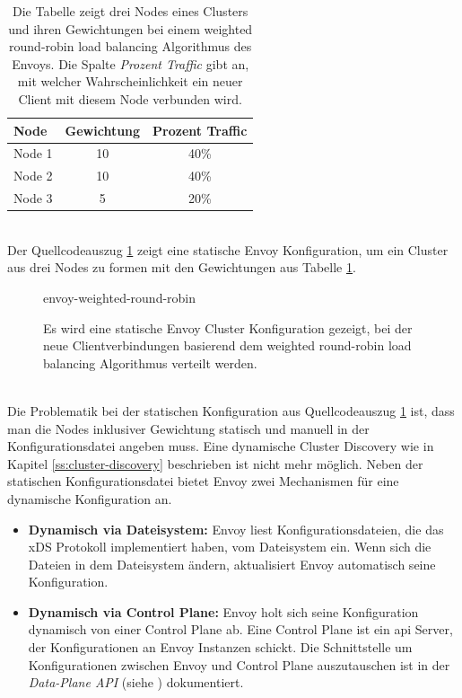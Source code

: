 \begin{table}[h!]
\centering
\renewcommand{\arraystretch}{1.5}
\begin{tabular}{|l|c|c|}
    \hline
    \textbf{Node} & \textbf{Gewichtung} & \textbf{Prozent Traffic} \\
    \hline
    \hline
    Node 1 & 10 & 40\% \\
    \hline
    Node 2 & 10 & 40\% \\
    \hline
    Node 3 & 5 & 20\% \\
    \hline
\end{tabular}
\caption{Die Tabelle zeigt drei Nodes eines Clusters und ihren Gewichtungen bei einem weighted round-robin load balancing Algorithmus des Envoys. Die Spalte \textit{Prozent Traffic} gibt an, mit welcher Wahrscheinlichkeit ein neuer Client mit diesem Node verbunden wird.}
\label{table:example-cluster-weight}
\end{table}
\\
Der Quellcodeauszug \ref{code:envoy-cluster-weight} zeigt eine statische Envoy Konfiguration, um ein Cluster aus drei Nodes zu formen mit den Gewichtungen aus Tabelle \ref{table:example-cluster-weight}.
\begin{figure}
    {envoy-weighted-round-robin}
    \caption{Es wird eine statische Envoy Cluster Konfiguration gezeigt, bei der neue Clientverbindungen basierend dem weighted round-robin load balancing Algorithmus verteilt werden.}
    \label{code:envoy-cluster-weight}
\end{figure}
\\
Die Problematik bei der statischen Konfiguration aus Quellcodeauszug \ref{code:envoy-cluster-weight} ist, dass man die Nodes inklusiver Gewichtung statisch und manuell in der Konfigurationsdatei angeben muss. Eine dynamische Cluster Discovery wie in Kapitel \ref{ss:cluster-discovery} beschrieben ist nicht mehr möglich.
Neben der statischen Konfigurationsdatei bietet Envoy zwei Mechanismen für eine dynamische Konfiguration an.
\begin{itemize}
  \item \textbf{Dynamisch via Dateisystem:} Envoy liest Konfigurationsdateien, die das xDS Protokoll implementiert haben, vom Dateisystem ein. Wenn sich die Dateien in dem Dateisystem ändern, aktualisiert Envoy automatisch seine Konfiguration.
    \cite{ConfigurationDynamicFilesystem}
  \item \textbf{Dynamisch via Control Plane:} Envoy holt sich seine Konfiguration dynamisch von einer Control Plane ab. Eine Control Plane ist ein \ac{api} Server, der Konfigurationen an Envoy Instanzen schickt. Die Schnittstelle um Konfigurationen zwischen Envoy und Control Plane auszutauschen ist in der \textit{Data-Plane API} (siehe \cite{EnvoyproxyDataplaneapi2021}) dokumentiert.
    \cite{ConfigurationDynamicControl}
\end{itemize}
